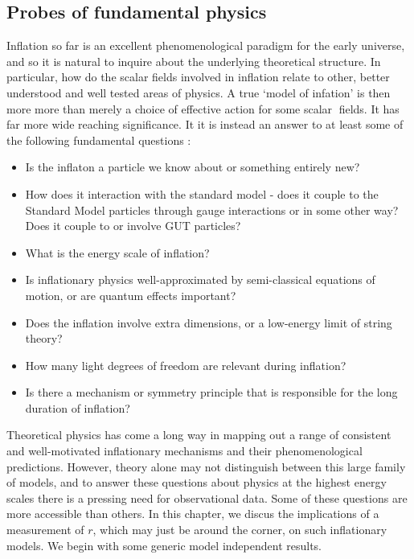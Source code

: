 \documentclass[a4paper,10pt]{article}
\begin{document}
\subsection{Probes of fundamental physics}

Inflation so far is an excellent phenomenological paradigm for the early universe, and so it is natural to inquire about the underlying theoretical structure. In particular, how do the scalar fields involved in inflation relate to other, better understood and well tested areas of physics. A true `model of infation' is then more more than merely a choice of  effective action for some scalar fields. It has far more wide reaching significance. It it is instead an answer to at least some of the following fundamental questions \cite{CMBPol}:

\begin{itemize}
\item Is the inflaton a particle we know about or something entirely new? 
\item How does it interaction with the standard model - does it couple to the Standard Model particles through gauge interactions or in some other way? Does it couple to or involve GUT particles?
\item What is the energy scale of inflation?
\item Is inflationary physics well-approximated by semi-classical equations of motion, or are quantum effects important? 
\item Does the inflation involve extra dimensions, or a low-energy limit of string theory? 
\item How many light degrees of freedom are relevant during inflation? 
\item Is there a mechanism or symmetry principle that is responsible for the long duration of inflation?
\end{itemize}

Theoretical physics has come a long way in mapping out a range of consistent and well-motivated inflationary mechanisms and their phenomenological predictions. However, theory alone may not distinguish between this large family of models, and to answer these questions about physics at the highest energy scales there is a pressing need for observational data. Some of these questions are more accessible than others. In this chapter, we discus the implications of a measurement of $r$, which may just be around the corner, on such inflationary models. We begin with some generic model independent results.\\
\end{document}
